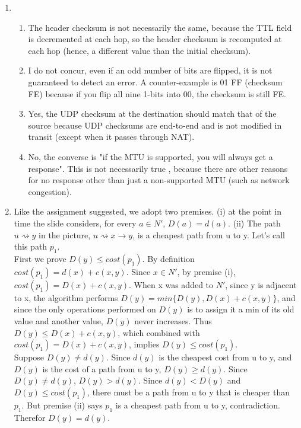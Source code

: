 \documentclass[12pt]{article}
\begin{document}
\begin{enumerate}
\begin{itemize}
	\end{itemize}
	\item %
	\begin{enumerate}
		\item The header checksum is not necessarily the same, because the TTL field is decremented at each hop, so the header checksum is recomputed at each hop (hence, a different value than the initial checksum).
		\item I do not concur, even if an odd number of bits are flipped, it is not guaranteed to detect an error. A counter-example is 01 FF (checksum FE) because if you flip all nine 1-bits into 00, the checksum is still FE.
		\item Yes, the UDP checksum at the destination should match that of the source because UDP checksums are end-to-end and is not modified in transit (except when it passes through NAT). 
		\item No, the converse is "if the MTU is supported, you will always get a response". This is not necessarily true , because there are other reasons for no response other than just a non-supported MTU (such as network congestion).
	\end{enumerate}
	\item %
        Like the assignment suggested, we adopt two premises. 
        (i) at the point in time the slide considers, for every $a \in N'$, $D(a) = d(a)$. 
        (ii) The path $u \rightsquigarrow y$ in the picture, $u \rightsquigarrow x \rightarrow y$,
        is a cheapest path from u to y. Let's call this path $p_1$.\\


        First we prove $D(y) \leq cost(p_1)$. By definition $cost(p_1) = d(x) + c(x,y)$. Since $x \in N'$, 
        by premise (i), $cost(p_1) = D(x) + c(x,y)$. When x was added to $N'$, since y is adjacent to x,
        the algorithm performs $D(y) = min\{D(y), D(x)+c(x,y)\}$, and since the only operations performed on $D(y)$ is to assign
        it a min of its old value and another value, $D(y)$ never increases. Thus $D(y) \leq D(x) + c(x,y)$,
        which combined with $cost(p_1) = D(x) + c(x,y)$, implies $D(y) \leq cost(p_1)$. \\

        Suppose $D(y) \neq d(y)$. Since $d(y)$ is the cheapest cost from u to y, and $D(y)$ is the 
        cost of a path from u to y, $D(y) \geq d(y)$. Since $D(y) \neq d(y)$, $D(y) > d(y)$. 
        Since $d(y) < D(y)$ and $D(y) \leq cost(p_1)$, there must be a path from u to y that is cheaper 
        than $p_1$. But premise (ii) says $p_1$ is a cheapest path from u to y, contradiction. Therefor $D(y) = d(y)$.
        


\end{enumerate}
\end{document}
